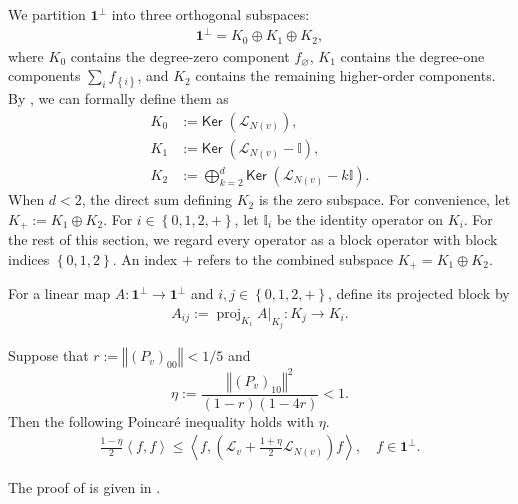 \documentclass[a4paper,12pt]{article}
\theoremstyle{plain}
\theoremstyle{definition}
\def\*#1{\mathbf{#1}} %
\def\+#1{\mathcal{#1}} %
\def\*#1{\boldsymbol{#1}} %
\def\+#1{\mathcal{#1}} %
\renewcommand{\emptyset}{\varnothing}
\newcommand{\norm}[1]{\left\Vert#1\right\Vert}
\newcommand{\set}[1]{\left\{#1\right\}}
\newcommand{\tuple}[1]{\left(#1\right)}
\newcommand{\inner}[2]{\left\langle #1,#2\right\rangle}
\newcommand{\tp}{\tuple}
\newcommand{\Ker}{\mathsf{Ker}\;}
\begin{document}
We partition $\*1^\perp$ into three orthogonal subspaces:
\begin{align*}
  \*1^\perp = K_0 \oplus K_1 \oplus K_2,
\end{align*}
where $K_0$ contains the degree-zero component $f_\emptyset$, $K_1$
contains the degree-one components $\sum_i f_{\set{i}}$, and $K_2$
contains the remaining higher-order components.
By , we can formally define them as
\begin{align*}
  K_0 &:= \Ker (\+L_{N(v)}), \\
  K_1 &:= \Ker (\+L_{N(v)} - \mathbb{I}), \\
  K_2 &:= \bigoplus_{k=2}^d
    \Ker (\+L_{N(v)}-k\mathbb{I}).
\end{align*}
When $d<2$, the direct sum defining $K_2$ is the zero subspace.
For convenience, let $K_+ := K_1 \oplus K_2$.
For $i\in\set{0,1,2,+}$, let $\mathbb I_i$ be the identity operator on
$K_i$.
For the rest of this section, we regard every operator as a block operator
with block indices $\set{0,1,2}$.
An index $+$ refers to the combined subspace $K_+=K_1\oplus K_2$.

\begin{definition} \label{block-matrix-via-Ki}
  For a linear map $A:\*1^\perp\to\*1^\perp$ and
  $i,j\in\set{0,1,2,+}$, define its projected block by
  \begin{align*}
    A_{ij} := \operatorname{proj}_{K_i} A \vert_{K_j}
    : K_j \longrightarrow K_i.
  \end{align*}
\end{definition}

\begin{theorem} \label{poincare-via-proj-norms}
  Suppose that $r := \norm{(P_v)_{00}} < 1/5$ and
  \[\eta := \frac{\norm{(P_v)_{10}}^2}{(1-r)(1-4r)} < 1.\]
  Then the following Poincar{\'e} inequality holds with $\eta$.
  \begin{align} \label{target:spgap-weighted-GD}
    \frac{1-\eta}{2}\inner{f}{f} \leq \inner{f}{\tp{\+L_v + \frac{1+\eta}{2}\+L_{N(v)}} f}, \quad f \in \*1^\perp.
  \end{align}
\end{theorem}

The proof of  is given in
.
\end{document}
